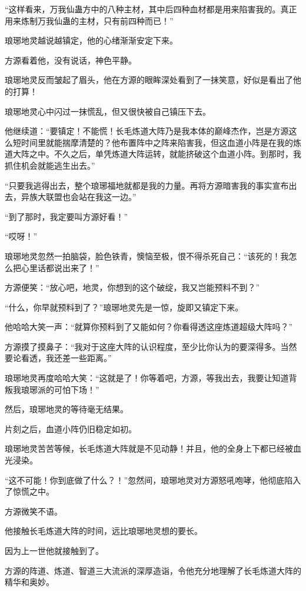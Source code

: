 \begin{this_body}
“这样看来，万我仙蛊方中的八种主材，其中后四种血材都是用来陷害我的。真正用来炼制万我仙蛊的主材，只有前四种而已！”

琅琊地灵越说越镇定，他的心绪渐渐安定下来。

方源看着他，没有说话，神色平静。

琅琊地灵反而皱起了眉头，他在方源的眼眸深处看到了一抹笑意，好似是看出了他的打算！

琅琊地灵心中闪过一抹慌乱，但又很快被自己镇压下去。

他继续道：“要镇定！不能慌！长毛炼道大阵乃是我本体的巅峰杰作，岂是方源这么短时间里就能揣摩清楚的？他布置阵中之阵来陷害我，但这血道小阵是在我的炼道大阵之中。不久之后，单凭炼道大阵运转，就能挤破这个血道小阵。到那时，我抓住机会就能逃生出去。”

“只要我逃得出去，整个琅琊福地就都是我的力量。再将方源暗害我的事实宣布出去，异族大联盟也会站在我这一边。”

“到了那时，我定要叫方源好看！”

“哎呀！”

琅琊地灵忽然一拍脑袋，脸色铁青，懊恼至极，恨不得杀死自己：“该死的！我怎么把心里话都说出来了！”

方源便笑：“放心吧，地灵，你想到的这个破绽，我又岂能预料不到？”

“什么，你早就预料到了？”琅琊地灵先是一惊，旋即又镇定下来。

他哈哈大笑一声：“就算你预料到了又能如何？你看得透这座炼道超级大阵吗？”

方源摸了摸鼻子：“我对于这座大阵的认识程度，至少比你认为的要深得多。当然要论看透，我还差一些距离。”

琅琊地灵再度哈哈大笑：“这就是了！你等着吧，方源，等我出去，我要让知道背叛我琅琊派的可怕下场！”

然后，琅琊地灵的等待毫无结果。

片刻之后，血道小阵仍旧稳定如初。

琅琊地灵苦苦等候，长毛炼道大阵就是不见动静！并且，他的全身上下都已经被血光浸染。

“这不可能！你到底做了什么？！”忽然间，琅琊地灵对方源怒吼咆哮，他彻底陷入了惊慌之中。

方源微笑不语。

他接触长毛炼道大阵的时间，远比琅琊地灵想的要长。

因为上一世他就接触到了。

方源的阵道、炼道、智道三大流派的深厚造诣，令他充分地理解了长毛炼道大阵的精华和奥妙。


\end{this_body}
